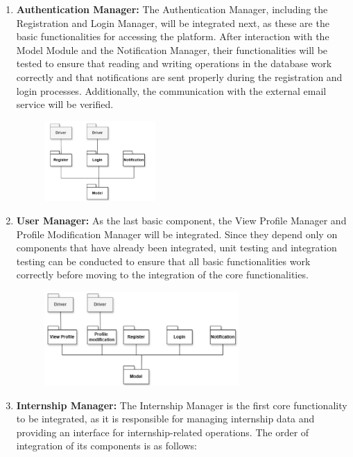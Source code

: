 \begin{enumerate}
    \item \textbf{Authentication Manager:} The Authentication Manager, including the Registration and Login Manager, will be integrated next, 
    as these are the basic functionalities for accessing the platform. After interaction with the Model Module and the Notification Manager, 
    their functionalities will be tested to ensure that reading and writing operations in the database work correctly and that notifications 
    are sent properly during the registration and login processes. Additionally, the communication with the external email service will be verified.
    \begin{figure}[H]
        \centering
        \includegraphics[width=0.4\textwidth]{Images/BottomUp/Auth.png}
    \end{figure} 
    \item \textbf{User Manager:} As the last basic component, the View Profile Manager and Profile Modification Manager will be integrated. 
    Since they depend only on components that have already been integrated, unit testing and integration testing can be conducted to ensure that 
    all basic functionalities work correctly before moving to the integration of the core functionalities.
    \begin{figure}[H]
        \centering
        \includegraphics[width=0.7\textwidth]{Images/BottomUp/Profile.png}
    \end{figure}
    \item \textbf{Internship Manager:} The Internship Manager is the first core functionality to be integrated, as it is responsible for managing 
    internship data and providing an interface for internship-related operations. The order of integration of its components is as follows: 

\end{enumerate}
